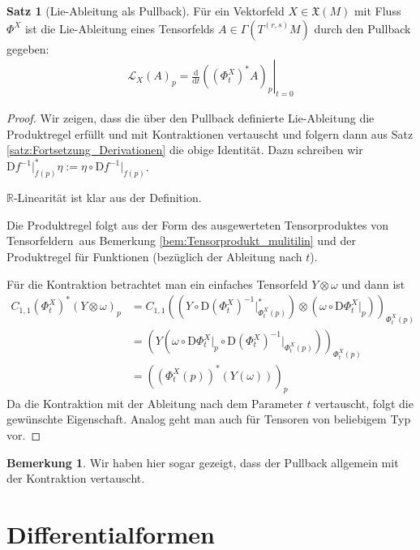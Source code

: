 \documentclass[a4paper]{scrreprt}
\numberwithin{equation}{chapter}
\newcommand{\D}{\mathrm{d}}
\newcommand{\DD}{\mathrm{D}}
\newcommand{\R}{\mathbb{R}}
\newcommand{\vf}{\mathfrak{X}}
\theoremstyle{definition}
\newtheorem{satz}[defn]{Satz}
\newtheorem{bem}[defn]{Bemerkung}
\begin{document}
		\begin{satz}[Lie-Ableitung als Pullback]
			Für ein Vektorfeld $X\in\vf(M)$ mit Fluss $\Phi^X$ ist die Lie-Ableitung eines Tensorfelds $A\in \Gamma(T^{(r,s)}M)$ durch den Pullback gegeben:
			\begin{align*}
			\mathcal{L}_X(A)_p=\left.\frac{\D}{\D t}\left((\Phi^X_t)^*A\right)_p\right |_{t=0}
			\end{align*}
			\begin{proof}
				Wir zeigen, dass die über den Pullback definierte Lie-Ableitung die Produktregel erfüllt und mit Kontraktionen vertauscht und folgern dann aus Satz \ref{satz:Fortsetzung_Derivationen} die obige Identität. Dazu schreiben wir $\DD f^{-1}\vert_{f(p)}^* \eta:=\eta\circ\DD f^{-1}\vert_{f(p)}$.
				
				$\R$-Linearität ist klar aus der Definition.
				
				Die Produktregel folgt aus der Form des \glqq ausgewerteten Tensorproduktes von Tensorfeldern\grqq\ aus Bemerkung \ref{bem:Tensorprodukt_mulitilin} und der Produktregel für Funktionen (bezüglich der Ableitung nach $t$).
				
				Für die Kontraktion betrachtet man ein einfaches Tensorfeld $Y\otimes\omega$ und dann ist 
				\begin{align*}
					C_{1,1}(\Phi_t^X)^*(Y\otimes\omega)_p&=C_{1,1}\left(\left(Y\circ\DD (\Phi_t^X)^{-1}\vert_{\Phi_t^X(p)}^*\right) \otimes\left(\omega\circ\DD \Phi_t^X\vert_p\right)\right)_{\Phi_t^X(p)}\\
					&=\left(Y\left(\omega\circ\DD \Phi_t^X\vert_p\circ\DD (\Phi_t^X)^{-1}\vert_{\Phi_t^X(p)}\right)\right)_{\Phi_t^X(p)}\\
					&=\left((\Phi_t^X(p))^*(Y(\omega))\right)_p
				\end{align*}
				Da die Kontraktion mit der Ableitung nach dem Parameter $t$ vertauscht, folgt die gewünschte Eigenschaft. Analog geht man auch für Tensoren von beliebigem Typ vor.
			\end{proof}
		\end{satz}
		
		\begin{bem}
			Wir haben hier sogar gezeigt, dass der Pullback allgemein mit der Kontraktion vertauscht.
		\end{bem}


\chapter{Differentialformen}\label{chap:Differentialformen}
\end{document}
